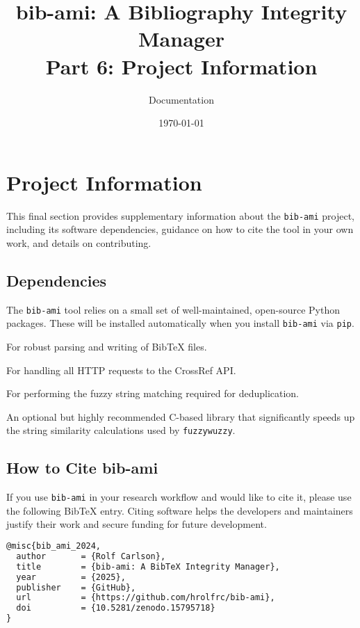 \documentclass[11pt, a4paper]{article}
\title{\textbf{bib-ami}: A Bibliography Integrity Manager \\ \large Part 6: Project Information}
\author{Documentation}
\date{\today}
\begin{document}
\maketitle
\tableofcontents
\newpage

\section{Project Information}

This final section provides supplementary information about the \texttt{bib-ami} project, including its software dependencies, guidance on how to cite the tool in your own work, and details on contributing.

\subsection{Dependencies}

The \texttt{bib-ami} tool relies on a small set of well-maintained, open-source Python packages. These will be installed automatically when you install \texttt{bib-ami} via \texttt{pip}.

\begin{description}[leftmargin=*]
    \item[\texttt{bibtexparser}] For robust parsing and writing of BibTeX files.
    \item[\texttt{requests}] For handling all HTTP requests to the CrossRef API.
    \item[\texttt{fuzzywuzzy}] For performing the fuzzy string matching required for deduplication.
    \item[\texttt{python-Levenshtein}] An optional but highly recommended C-based library that significantly speeds up the string similarity calculations used by \texttt{fuzzywuzzy}.
\end{description}

\subsection{How to Cite bib-ami}

If you use \texttt{bib-ami} in your research workflow and would like to cite it, please use the following BibTeX entry. Citing software helps the developers and maintainers justify their work and secure funding for future development.

\begin{lstlisting}[language=tex, caption={BibTeX entry for bib-ami}]
@misc{bib_ami_2024,
  author       = {Rolf Carlson},
  title        = {bib-ami: A BibTeX Integrity Manager},
  year         = {2025},
  publisher    = {GitHub},
  url          = {https://github.com/hrolfrc/bib-ami},
  doi          = {10.5281/zenodo.15795718}
}
\end{lstlisting}
\end{document}
